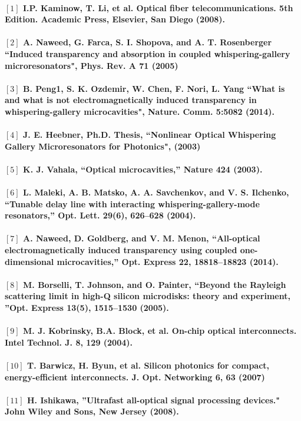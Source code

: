 \paragraph{\normalfont \large $[1]$ I.P. Kaminow, T. Li, et al. Optical fiber telecommunications. 5th Edition. Academic Press, Elsevier, San Diego (2008). \\ 
\\$[2]$ A. Naweed, G. Farca, S. I. Shopova, and A. T. Rosenberger “Induced transparency and absorption in coupled whispering-gallery microresonators", Phys. Rev. A \textbf{71} (2005)\\
\\$[3]$ B. Peng1, S. K. Ozdemir, W. Chen, F. Nori, L. Yang “What is and what is not electromagnetically induced transparency in whispering-gallery microcavities", Nature. Comm. \textbf{5}:5082 (2014). \\
\\$[4]$ J. E. Heebner, Ph.D. Thesis, “Nonlinear Optical Whispering Gallery Microresonators for Photonics", (2003)  \\
\\$[5]$ K. J. Vahala, “Optical microcavities,” Nature \textbf{424} (2003).\\
\\$[6]$ L. Maleki, A. B. Matsko, A. A. Savchenkov, and V. S. Ilchenko, “Tunable delay line with interacting
whispering-gallery-mode resonators,” Opt. Lett. 29(6), 626–628 (2004).\\
\\$[7]$ A. Naweed, D. Goldberg, and V. M. Menon, “All-optical electromagnetically induced transparency using
coupled one-dimensional microcavities,” Opt. Express 22, 18818–18823 (2014).\\
\\$[8]$ M. Borselli, T. Johnson, and O. Painter, “Beyond the Rayleigh scattering limit in high-Q silicon microdisks:
theory and experiment, ”Opt. Express 13(5), 1515–1530 (2005).\\
\\$[9]$ M. J. Kobrinsky, B.A. Block, et al. On-chip optical interconnects. Intel Technol. J. \textbf{8}, 129 (2004).\\
\\$[10]$ T. Barwicz, H. Byun, et al. Silicon photonics for compact, energy-efficient interconnects. J. Opt. Networking \textbf{6}, 63 (2007)\\
\\$[11]$ H. Ishikawa, ”Ultrafast all-optical signal processing devices." John Wiley and Sons, New Jersey (2008). \\
}
